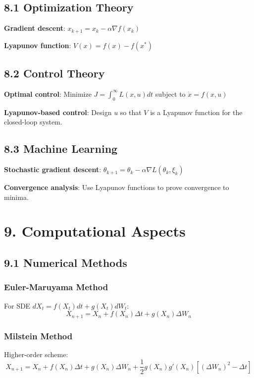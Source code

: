 \documentclass{amsart}
\theoremstyle{plain}
\theoremstyle{definition}
\theoremstyle{remark}
\begin{document}
\subsection{8.1 Optimization Theory}

\textbf{Gradient descent}: $x_{k+1} = x_k - \alpha \nabla f(x_k)$

\textbf{Lyapunov function}: $V(x) = f(x) - f(x^*)$

\subsection{8.2 Control Theory}

\textbf{Optimal control}: Minimize $J = \int_0^\infty L(x,u)dt$ subject to $\dot{x} = f(x,u)$

\textbf{Lyapunov-based control}: Design $u$ so that $V$ is a Lyapunov function for the closed-loop system.

\subsection{8.3 Machine Learning}

\textbf{Stochastic gradient descent}: $\theta_{k+1} = \theta_k - \alpha \nabla L(\theta_k, \xi_k)$

\textbf{Convergence analysis}: Use Lyapunov functions to prove convergence to minima.

\section{9. Computational Aspects}

\subsection{9.1 Numerical Methods}

\subsubsection{Euler-Maruyama Method}

For SDE $dX_t = f(X_t)dt + g(X_t)dW_t$:
\[
X_{n+1} = X_n + f(X_n)\Delta t + g(X_n)\Delta W_n
\]

\subsubsection{Milstein Method}

Higher-order scheme:
\[
X_{n+1} = X_n + f(X_n)\Delta t + g(X_n)\Delta W_n + \frac{1}{2}g(X_n)g'(X_n)[(\Delta W_n)^2 - \Delta t]
\]
\end{document}
